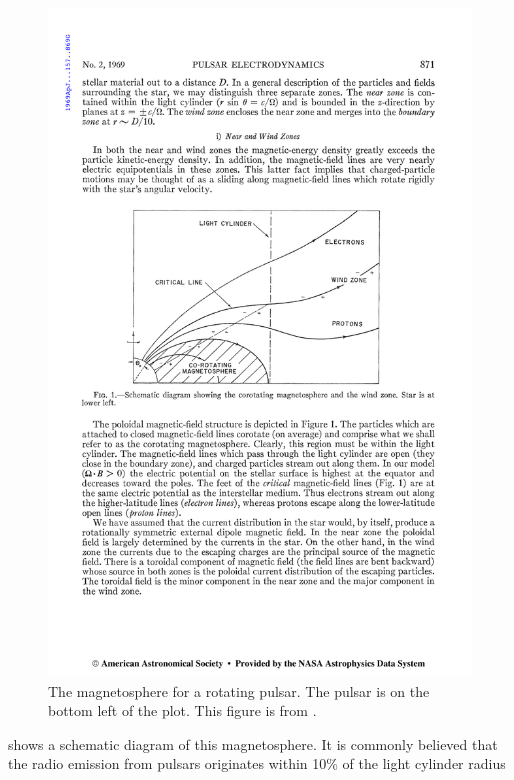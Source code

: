 \begin{figure}[htbp]
  \centering
    \includegraphics{chapters/pulsar_pwn_system/figures/pulsar_magnetosphere.pdf}
  \caption{The magnetosphere for a rotating pulsar.
  The pulsar is on the bottom left of the plot. This figure is
  from \cite{goldreich_1969_pulsar-electrodynamics}.}
\end{figure}

 shows a schematic diagram of this
magnetosphere. It is commonly believed that the radio emission
from pulsars originates within 10\% of the light cylinder radius
\citep[see][and references therein]{kijak_2003a_radio-emission}

